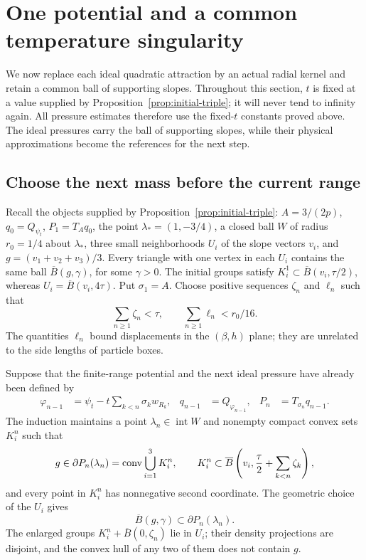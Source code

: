 \section{One potential and a common temperature singularity}\label{sec:construction}
We now replace each ideal quadratic attraction by an actual radial kernel and
retain a common ball of supporting slopes. Throughout this section, $t$ is
fixed at a value supplied by Proposition~\ref{prop:initial-triple}; it will
never tend to infinity again. All pressure estimates therefore use the
fixed-$t$ constants proved above. The ideal pressures carry the ball of
supporting slopes, while their physical approximations become the references
for the next step.

\subsection{Choose the next mass before the current range}
Recall the objects supplied by Proposition~\ref{prop:initial-triple}:
$A=3/(2p)$, $q_0=Q_{\psi_t}$, $P_1=T_Aq_0$, the point
$\lambda_*=(1,-3/4)$, a closed ball $W$ of radius $r_0=1/4$ about
$\lambda_*$, three small neighborhoods $U_i$ of the slope vectors $v_i$, and
$g=(v_1+v_2+v_3)/3$. Every triangle with one vertex in each $U_i$ contains
the same ball $\overline B(g,\gamma)$, for some $\gamma>0$.
The initial groups satisfy
$K_i^1\subset\overline B(v_i,\tau/2)$, whereas
$U_i=\overline B(v_i,4\tau)$.
Put $\sigma_1=A$. Choose positive sequences $\zeta_n$ and $\ell_n$ such that
\begin{equation}\label{eq:budgets}
 \sum_{n\ge1}\zeta_n<\tau,
 \qquad \sum_{n\ge1}\ell_n<r_0/16.
\end{equation}
The quantities $\ell_n$ bound displacements in the $(\beta,h)$ plane; they are
unrelated to the side lengths of particle boxes.

Suppose that the finite-range potential and the next ideal pressure have
already been defined by
\begin{align*}
 \varphi_{n-1}&=\psi_t-t\sum_{k<n}\sigma_k w_{R_k},
 &q_{n-1}&=Q_{\varphi_{n-1}},
 &P_n&=T_{\sigma_n}q_{n-1}.
\end{align*}
The induction maintains a point $\lambda_n\in\operatorname{int}W$ and
nonempty compact convex sets $K_i^n$ such that
\begin{equation}\label{eq:inductive-slopes}
 g\in\partial P_n(\lambda_n)
   =\operatorname{conv}\bigcup_{i=1}^3K_i^n,
 \qquad
 K_i^n\subset\overline B\left(v_i,\frac\tau2+
                          \sum_{k<n}\zeta_k\right),
\end{equation}
and every point in $K_i^n$ has nonnegative second coordinate. The geometric
choice of the $U_i$ gives
\begin{equation}\label{eq:common-ball}
 \overline B(g,\gamma)\subset\partial P_n(\lambda_n).
\end{equation}
The enlarged groups $K_i^n+\overline B(0,\zeta_n)$ lie in $U_i$;
their density projections are disjoint, and the convex hull of any two of
them does not contain $g$.

